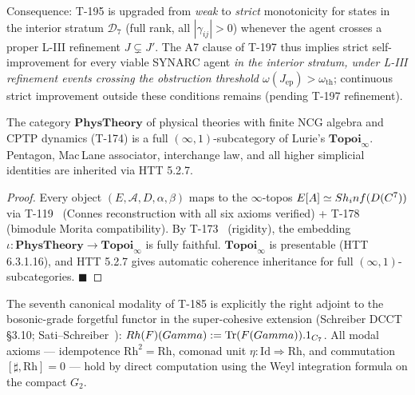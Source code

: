 Consequence: T-195 is upgraded from \emph{weak} to \emph{strict}
monotonicity for states in the interior stratum $\mathcal{D}_7$ (full
rank, all $|\gamma_{ij}| > 0$) whenever the agent crosses a proper
L-III refinement $J \subsetneq J'$. The A7 clause of T-197 thus implies
strict self-improvement for every viable SYNARC agent \emph{in the
interior stratum, under L-III refinement events crossing the
obstruction threshold $\omega(J_{\mathrm{ep}}) > \omega_{\mathrm{th}}$};
continuous strict improvement outside these conditions remains
 (pending T-197 refinement).

\begin{theorembox}
\label{thm:t211-phystheory}
The category $\mathbf{PhysTheory}$ of physical theories with finite
NCG algebra and CPTP dynamics (T-174) is a full $(\infty,1)$-subcategory
of Lurie's $\mathbf{Topoi}_\infty$. Pentagon, Mac\,Lane associator,
interchange law, and all higher simplicial identities are inherited
via HTT 5.2.7.
\end{theorembox}

\begin{proof}
Every object $(E, \mathcal A, D, \alpha, \beta)$ maps to the
$\infty$-topos $E[A] \simeq Sh_inf(D(C^7))$ via
T-119~ (Connes reconstruction with all six axioms
verified) + T-178~ (bimodule Morita compatibility). By
T-173~ (rigidity), the embedding
$\iota: \mathbf{PhysTheory} \to \mathbf{Topoi}_\infty$ is fully
faithful. $\mathbf{Topoi}_\infty$ is presentable (HTT 6.3.1.16), and
HTT 5.2.7 gives automatic coherence inheritance for full
$(\infty,1)$-subcategories. $\blacksquare$
\end{proof}

\begin{theorembox}
\label{thm:t212-rh}
The seventh canonical modality of T-185 is explicitly the right
adjoint to the bosonic-grade forgetful functor in the super-cohesive
extension (Schreiber DCCT~\cite{schreiber2013} \S3.10;
Sati--Schreiber~\cite{sati-schreiber2018}):
$Rh(F)(Gamma) := \Tr(F(Gamma)) . 1_{C_7}$.
All modal axioms --- idempotence $\mathrm{Rh}^2 = \mathrm{Rh}$, comonad
unit $\eta: \mathrm{Id} \Rightarrow \mathrm{Rh}$, and commutation
$[\sharp, \mathrm{Rh}] = 0$ --- hold by direct computation using the
Weyl integration formula on the compact $G_2$.
\end{theorembox}

